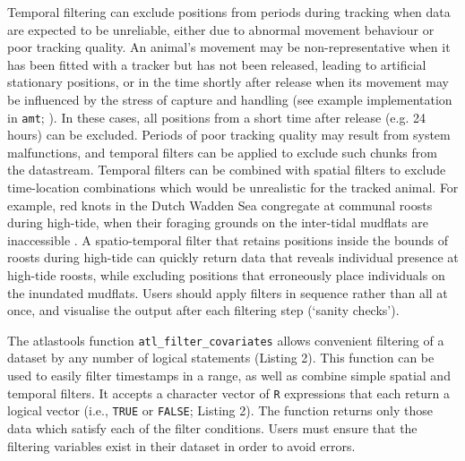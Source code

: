 \documentclass[10pt,paper=a4,headings=standardclasses
]{scrartcl}
\begin{document}
Temporal filtering can exclude positions from periods during tracking when data are expected to be unreliable, either due to abnormal movement behaviour or poor tracking quality. 
An animal’s movement may be non-representative when it has been fitted with a tracker but has not been released, leading to artificial stationary positions, or in the time shortly after release when its movement may be influenced by the stress of capture and handling (see example implementation in \texttt{amt}; \citet{signer2019}). 
In these cases, all positions from a short time after release (e.g. 24 hours) can be excluded. 
Periods of poor tracking quality may result from system malfunctions, and temporal filters can be applied to exclude such chunks from the datastream. 
Temporal filters can be combined with spatial filters to exclude time-location combinations which would be unrealistic for the tracked animal. 
For example, red knots in the Dutch Wadden Sea congregate at communal roosts during high-tide, when their foraging grounds on the inter-tidal mudflats are inaccessible \citep{vangils2006}.
A spatio-temporal filter that retains positions inside the bounds of roosts during high-tide can quickly return data that reveals individual presence at high-tide roosts, while excluding positions that erroneously place individuals on the inundated mudflats.
Users should apply filters in sequence rather than all at once, and visualise the output after each filtering step (`sanity checks').

The atlastools function \texttt{atl\_filter\_covariates} allows convenient filtering of a dataset by any number of logical statements (Listing 2).
This function can be used to easily filter timestamps in a range, as well as combine simple spatial and temporal filters.
It accepts a character vector of \texttt{R} expressions that each return a logical vector (i.e., \texttt{TRUE} or \texttt{FALSE}; Listing 2).
The function returns only those data which satisfy each of the filter conditions. 
Users must ensure that the filtering variables exist in their dataset in order to avoid errors.
\end{document}

